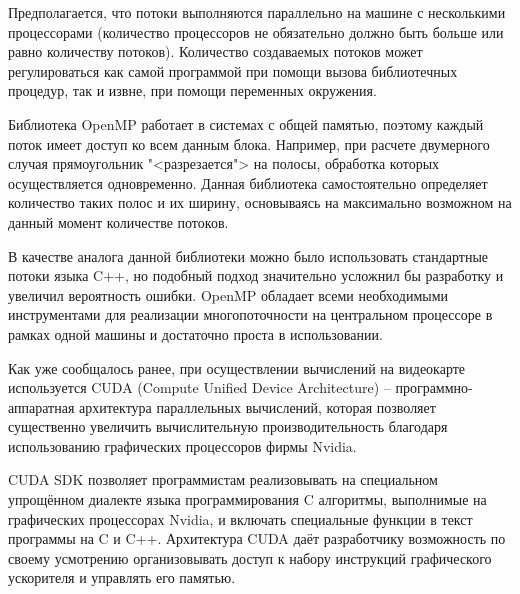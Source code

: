 \documentclass[a4paper, 14pt]{extarticle}
\theoremstyle{definition}
\begin{document}
\par Предполагается, что потоки выполняются параллельно на машине с несколькими процессорами (количество процессоров не обязательно должно быть больше или равно количеству потоков). Количество создаваемых потоков может регулироваться как самой программой при помощи вызова библиотечных процедур, так и извне, при помощи переменных окружения.

\par Библиотека OpenMP работает в системах с общей памятью, поэтому каждый поток имеет доступ ко всем данным блока. Например, при расчете двумерного случая прямоугольник "<разрезается"> на полосы, обработка которых осуществляется одновременно. Данная библиотека самостоятельно определяет количество таких полос и их ширину, основываясь на максимально возможном на данный момент количестве потоков.

\par В качестве аналога данной библиотеки можно было использовать стандартные потоки языка C++, но подобный подход значительно усложнил бы разработку и увеличил вероятность ошибки. OpenMP обладает всеми необходимыми инструментами для реализации многопоточности на центральном процессоре в рамках одной машины и достаточно проста в использовании.


\par Как уже сообщалось ранее, при осуществлении вычислений на видеокарте используется CUDA (Compute Unified Device Architecture) -- программно-аппаратная архитектура параллельных вычислений, которая позволяет существенно увеличить вычислительную производительность благодаря использованию графических процессоров фирмы Nvidia.

\par CUDA SDK позволяет программистам реализовывать на специальном упрощённом диалекте языка программирования C алгоритмы, выполнимые на графических процессорах Nvidia, и включать специальные функции в текст программы на C и C++. Архитектура CUDA даёт разработчику возможность по своему усмотрению организовывать доступ к набору инструкций графического ускорителя и управлять его памятью.
\end{document}
